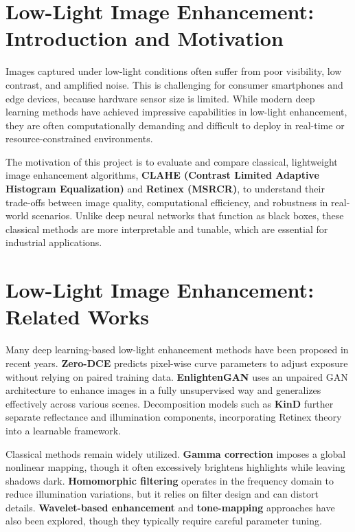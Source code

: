 \section{Low-Light Image Enhancement: Introduction and Motivation}
Images captured under low-light conditions often suffer from poor visibility, low contrast, and amplified noise. This is challenging for consumer smartphones and edge devices, because hardware sensor size is limited. While modern deep learning methods have achieved impressive capabilities in low-light enhancement, they are often computationally demanding and difficult to deploy in real-time or resource-constrained environments.

The motivation of this project is to evaluate and compare classical, lightweight image enhancement algorithms, \textbf{CLAHE (Contrast Limited Adaptive Histogram Equalization)} and \textbf{Retinex (MSRCR)}, to understand their trade-offs between image quality, computational efficiency, and robustness in real-world scenarios. Unlike deep neural networks that function as black boxes, these classical methods are more interpretable and tunable, which are essential for industrial applications.

\section{Low-Light Image Enhancement: Related Works}
Many deep learning-based low-light enhancement methods have been proposed in recent years. \textbf{Zero-DCE} \cite{guo2020zero} predicts pixel-wise curve parameters to adjust exposure without relying on paired training data. \textbf{EnlightenGAN} \cite{jiang2021enlightengan} uses an unpaired GAN architecture to enhance images in a fully unsupervised way and generalizes effectively across various scenes. Decomposition models such as \textbf{KinD} \cite{zhang2021beyond} further separate reflectance and illumination components, incorporating Retinex theory into a learnable framework.

Classical methods remain widely utilized. \textbf{Gamma correction} imposes a global nonlinear mapping, though it often excessively brightens highlights while leaving shadows dark. \textbf{Homomorphic filtering} operates in the frequency domain to reduce illumination variations, but it relies on filter design and can distort details. \textbf{Wavelet-based enhancement} and \textbf{tone-mapping} approaches have also been explored, though they typically require careful parameter tuning.

